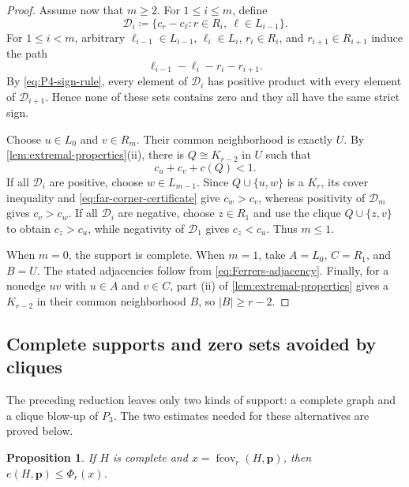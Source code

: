 \documentclass[10pt]{article}
\numberwithin{equation}{section}
\newtheorem{proposition}[proposition]{Proposition}
\newcommand{\fcov}{\operatorname{fcov}}
\newcommand{\vct}[1]{\boldsymbol{#1}}
\begin{document}
\begin{proof}
Assume now that $m\ge2$.  For $1\le i\le m$, define
\[
 \mathcal D_i\coloneqq\{c_r-c_\ell\colon r\in R_i,\ \ell\in L_{i-1}\}.
\]
For $1\le i<m$, arbitrary $\ell_{i-1}\in L_{i-1}$, $\ell_i\in L_i$, $r_i\in R_i$, and $r_{i+1}\in R_{i+1}$ induce the path
\[
 \ell_{i-1}-\ell_i-r_i-r_{i+1}.
\]
By \cref{eq:P4-sign-rule}, every element of $\mathcal D_i$ has positive product with every element of $\mathcal D_{i+1}$.  Hence none of these sets contains zero and they all have the same strict sign.

Choose $u\in L_0$ and $v\in R_m$.  Their common neighborhood is exactly $U$.  By \cref{lem:extremal-properties}(ii), there is $Q\cong K_{r-2}$ in $U$ such that
\begin{equation}\label{eq:far-corner-certificate}
 c_u+c_v+c(Q)<1.
\end{equation}
If all $\mathcal D_i$ are positive, choose $w\in L_{m-1}$.  Since $Q\cup\{u,w\}$ is a $K_r$, its cover inequality and \cref{eq:far-corner-certificate} give $c_w>c_v$, whereas positivity of $\mathcal D_m$ gives $c_v>c_w$.  If all $\mathcal D_i$ are negative, choose $z\in R_1$ and use the clique $Q\cup\{z,v\}$ to obtain $c_z>c_u$, while negativity of $\mathcal D_1$ gives $c_z<c_u$.  Thus $m\le1$.

When $m=0$, the support is complete.  When $m=1$, take $A=L_0$, $C=R_1$, and $B=U$.  The stated adjacencies follow from \cref{eq:Ferrers-adjacency}.  Finally, for a nonedge $uv$ with $u\in A$ and $v\in C$, part \textup{(ii)} of \cref{lem:extremal-properties} gives a $K_{r-2}$ in their common neighborhood $B$, so $|B|\ge r-2$.
\end{proof}

\subsection{Complete supports and zero sets avoided by cliques}\label{sec:complete-terminal}

The preceding reduction leaves only two kinds of support: a complete graph and a clique blow-up of $P_3$.  The two estimates needed for these alternatives are proved below.

\begin{proposition}\label{prop:complete-support-bound}
If $H$ is complete and $x=\fcov_r(H,\vct p)$, then $e(H,\vct p)\le \Phi_r(x)$.
\end{proposition}
\end{document}
